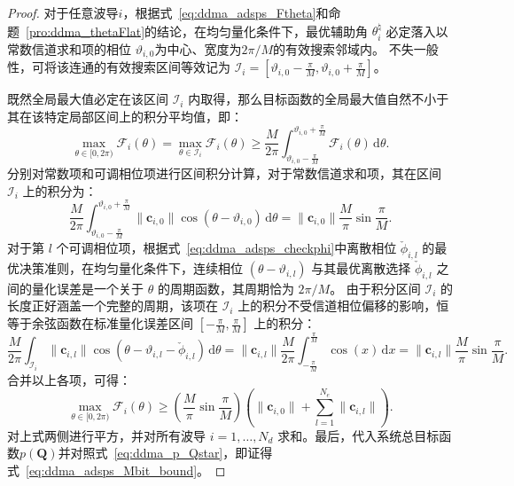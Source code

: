\begin{proof}
	对于任意波导$i$，根据式~\eqref{eq:ddma_adsps_Ftheta}和命题~\ref{pro:ddma_thetaFlat}的结论，在均匀量化条件下，最优辅助角 $\theta_i^{\natural}$ 必定落入以常数信道求和项的相位 $\vartheta_{i,0}$为中心、宽度为$2\pi/M$的有效搜索邻域内。
	不失一般性，可将该连通的有效搜索区间等效记为 $\mathcal{I}_i = [\vartheta_{i,0} - \frac{\pi}{M}, \vartheta_{i,0} + \frac{\pi}{M}]$。
	
	既然全局最大值必定在该区间 $\mathcal{I}_i$ 内取得，那么目标函数的全局最大值自然不小于其在该特定局部区间上的积分平均值，即：
	\begin{equation}
		\max_{\theta \in [0, 2\pi)} \mathcal F_i(\theta) = \max_{\theta \in \mathcal{I}_i} \mathcal F_i(\theta) \ge \frac{M}{2\pi} \int_{\vartheta_{i,0} - \frac{\pi}{M}}^{\vartheta_{i,0} + \frac{\pi}{M}} \mathcal F_i(\theta) \, \mathrm{d}\theta.
	\end{equation}
	分别对常数项和可调相位项进行区间积分计算，对于常数信道求和项，其在区间 $\mathcal{I}_i$ 上的积分为：
	\begin{equation}
		\frac{M}{2\pi} \int_{\vartheta_{i,0} - \frac{\pi}{M}}^{\vartheta_{i,0} + \frac{\pi}{M}} \|\bm c_{i,0}\| \cos(\theta - \vartheta_{i,0}) \, \mathrm{d}\theta  
		= \|\bm c_{i,0}\| \frac{M}{\pi} \sin \frac{\pi}{M}.
	\end{equation}
	对于第 $l$ 个可调相位项，根据式~\eqref{eq:ddma_adsps_checkphi}中离散相位 $\check{\phi}_{i,l}$ 的最优决策准则，在均匀量化条件下，连续相位 $(\theta - \vartheta_{i,l})$ 与其最优离散选择 $\check{\phi}_{i,l}$ 之间的量化误差是一个关于 $\theta$ 的周期函数，其周期恰为 $2\pi/M$。
	由于积分区间 $\mathcal{I}_i$ 的长度正好涵盖一个完整的周期，该项在 $\mathcal{I}_i$ 上的积分不受信道相位偏移的影响，恒等于余弦函数在标准量化误差区间 $[-\frac{\pi}{M}, \frac{\pi}{M}]$ 上的积分：
	\begin{equation}
		\frac{M}{2\pi} \int_{\mathcal{I}_i} \|\bm c_{i,l}\| \cos(\theta - \vartheta_{i,l} - \check{\phi}_{i,l}) \, \mathrm{d}\theta = \|\bm c_{i,l}\| \frac{M}{2\pi} \int_{-\frac{\pi}{M}}^{\frac{\pi}{M}} \cos(x) \, \mathrm{d}x = \|\bm c_{i,l}\| \frac{M}{\pi} \sin \frac{\pi}{M}.
	\end{equation}
	合并以上各项，可得：
	\begin{equation}
		\max_{\theta \in [0, 2\pi)} \mathcal F_i(\theta) \ge \left( \frac{M}{\pi} \sin \frac{\pi}{M} \right) \left( \|\bm c_{i,0}\| + \sum_{l=1}^{N_e} \|\bm c_{i,l}\| \right).
	\end{equation}
	对上式两侧进行平方，并对所有波导 $i=1,\dots,N_d$ 求和。最后，代入系统总目标函数$p(\bm Q)$并对照式~\eqref{eq:ddma_p_Qstar}，即证得式~\eqref{eq:ddma_adsps_Mbit_bound}。
\end{proof}

